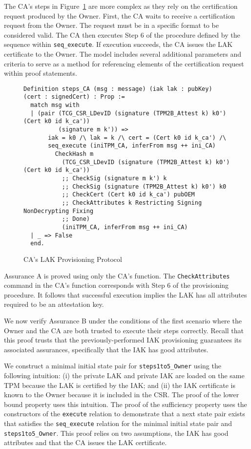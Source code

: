 \documentclass[runningheads]{llncs}
\begin{document}
The CA's steps in Figure~\ref{fig:lak_model_CA} are more complex as
they rely on the certification request produced by the Owner. 
First, the CA waits to receive a certification request from the
Owner. The request must be in a specific
format to be considered valid. The CA then executes Step 6 of the
procedure defined by the sequence within \verb|seq_execute|. If
execution succeeds, the CA issues the LAK certificate to the Owner.
The model includes several additional parameters and criteria to serve
as a method for referencing elements of the certification request
within proof statements.

\begin{figure}[hpbt]
\begin{lstlisting}[language=Coq]
Definition steps_CA (msg : message) (iak lak : pubKey) (cert : signedCert) : Prop :=
  match msg with
  | (pair (TCG_CSR_LDevID (signature (TPM2B_Attest k) k0') (Cert k0 id k_ca'))
          (signature m k')) =>
       iak = k0 /\ lak = k /\ cert = (Cert k0 id k_ca') /\
       seq_execute (iniTPM_CA, inferFrom msg ++ ini_CA)
         CheckHash m
           (TCG_CSR_LDevID (signature (TPM2B_Attest k) k0') (Cert k0 id k_ca'))
           ;; CheckSig (signature m k') k
           ;; CheckSig (signature (TPM2B_Attest k) k0') k0
           ;; CheckCert (Cert k0 id k_ca') pubOEM
           ;; CheckAttributes k Restricting Signing NonDecrypting Fixing
           ;; Done)
           (iniTPM_CA, inferFrom msg ++ ini_CA)
  | _ => False
  end.
\end{lstlisting}
\caption{CA's LAK Provisioning Protocol}
\label{fig:lak_model_CA}
\end{figure}

Assurance A is proved using only the CA's function. The
\verb|CheckAttributes| command in the CA's function corresponds with
Step 6 of the provisioning procedure.  It follows that successful
execution implies the LAK has all attributes required to be an
attestation key.

We now verify Assurance B under the conditions of the first scenario
where the Owner and the CA are both trusted to execute their steps
correctly. Recall that this proof trusts that the
previously-performed IAK provisioning guarantees its associated
assurances, specifically that the IAK has good attributes.

We construct a minimal initial state pair for \verb|steps1to5_Owner|
using the following intuition: (i) the private LAK and private IAK are
loaded on the same TPM because the LAK is certified by the IAK; and
(ii) the IAK certificate is known to the Owner because it is included
in the CSR.  The proof of the lower bound property uses this
intuition.  The proof of the sufficiency property uses the
constructors of the \verb|execute| relation to demonstrate that a next
state pair exists that satisfies the \verb|seq_execute| relation for
the minimal initial state pair and \verb|steps1to5_Owner|. This proof
relies on two assumptions, the IAK has good attributes and that the CA
issues the LAK certificate.
\end{document}
